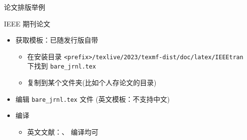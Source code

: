 \begin{frame}[fragile]{论文排版举例}
  \begin{block}{IEEE 期刊论文}
    \begin{itemize}
      \item 获取模板：已随发行版自带
            \begin{itemize}
              \item 在安装目录 \verb|<prefix>/texlive/2023/texmf-dist/doc/latex/IEEEtran|
                    下找到 \verb|bare_jrnl.tex|
              \item 复制到某个文件夹(比如个人存论文的目录)
            \end{itemize}
      \item 编辑 \verb|bare_jrnl.tex| 文件 (英文模板：不支持中文)
      \item 编译
            \begin{itemize}
              \item 英文文献：\XeLaTeX{}、\pdfLaTeX{} 编译均可
            \end{itemize}
    \end{itemize}
  \end{block}
\end{frame}
